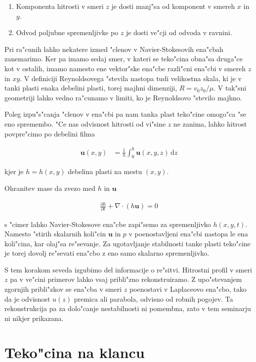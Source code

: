 \documentclass[a4paper,12pt]{article}
\renewcommand{\vec}{\mathbf}
\newcommand{\dd}{\,\mathrm{d}}
\begin{document}
\begin{enumerate}
  \item Komponenta hitrosti v smeri $z$ je dosti manj"sa od komponent v smereh $x$ in $y$. 
  \item Odvod poljubne spremenljivke po $z$ je dosti ve"cji od odvoda v ravnini. 
\end{enumerate}

Pri ra"cunih lahko nekatere izmed "clenov v Navier-Stokesovih ena"cbah zanemarimo. Ker pa imamo sedaj smer, v kateri se teko"cina obna"sa druga"ce kot v ostalih, imamo namesto ene vektor"ske ena"cbe razli"cni ena"cbi v smereh $z$ in $xy$. V definiciji Reynoldsovega "stevila nastopa tudi velikostna skala, ki je v tanki plasti enaka debelini plasti, torej majhni dimenziji, $R = v_0 z_0/\mu$. V tak"sni geometriji lahko vedno ra"cunamo v limiti, ko je Reynoldsovo "stevilo majhno. 

Poleg izpu"s"canja "clenov v ena"cbi pa nam tanka plast teko"cine omogo"ca "se eno spremembo. "Ce nas odvisnost hitrosti od vi"sine $z$ ne zanima, lahko hitrost povpre"cimo po debelini filma

\begin{align}
 \vec u(x,y) &=  \frac{1}{h}\int_0^h \vec u(x,y,z)\dd z
\end{align}

kjer je $h = h(x,y)$ debelina plasti na mestu $(x,y)$. 

Ohranitev mase da zvezo med $h$ in $\vec u$

\begin{align}
  \frac{\partial h}{\partial t} + \nabla\cdot(h\vec u) = 0
\end{align}

s "cimer lahko Navier-Stokesove ena"cbe zapi"semo za spremenljivko $h(x,y,t)$. Namesto "stirih skalarnih koli"cin $\vec u$ in $p$ v poenostavljeni ena"cbi nastopa le ena koli"cina, kar olaj"sa re"sevanje. Za ugotavljanje stabilnosti tanke plasti teko"cine je torej dovolj re"sevati ena"cbo z eno samo skalarno spremenljivko. 

S tem korakom seveda izgubimo del informacije o re"sitvi. Hitrostni profil v smeri $z$ pa v ve"cini primerov lahko vsaj pribli"zno rekonstruiramo. Z upo"stevanjem zgornjih pribli"zkov se ena"cba v smeri $z$ poenostavi v Laplaceovo ena"cbo, tako da je odvisnost $u(z)$ premica ali parabola, odvisno od robnih pogojev. Ta rekonstrukcija pa za dolo"canje nestabilnosti ni pomembna, zato v tem seminarju ni nikjer prikazana. 

\section{Teko"cina na klancu}
\end{document}
